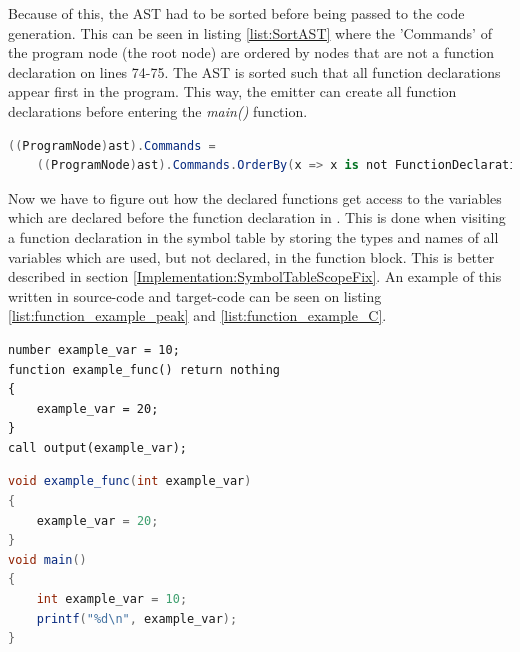 Because of this, the AST had to be sorted before being passed to the code generation. This can be seen in listing \ref{list:SortAST} where the 'Commands' of the program node (the root node) are ordered by nodes that are not a function declaration on lines 74-75. The AST is sorted such that all function declarations appear first in the program. This way, the emitter can create all function declarations before entering the \textit{main()} function. 

\begin{lstlisting}[language = csharp, firstnumber=74, label={list:SortAST},caption=Sorting AST so function declarations appear at the top - CobraCompiler/Program.cs]
((ProgramNode)ast).Commands = 
    ((ProgramNode)ast).Commands.OrderBy(x => x is not FunctionDeclarationNode).ToList();
\end{lstlisting}

\noindent
Now we have to figure out how the declared functions get access to the variables which are declared before the function declaration in \lang. This is done when visiting a function declaration in the symbol table by storing the types and names of all variables which are used, but not declared, in the function block. This is better described in section \ref{Implementation:SymbolTableScopeFix}. An example of this written in source-code and target-code can be seen on listing \ref{list:function_example_peak} and \ref{list:function_example_C}.

\begin{lstlisting}[language = scriptkid, firstnumber=0, label={list:function_example_peak},caption=Example of a function being declared after a variabe has been declared. The function then uses the variable without passing it as an argument]
number example_var = 10;
function example_func() return nothing
{
    example_var = 20;
}
call output(example_var);
\end{lstlisting}

\begin{lstlisting}[language = csharp, firstnumber=1, label={list:function_example_C},caption=Example of the corresponding code from listing \ref{list:function_example_peak} written in C. The function gets declared before entering main and an additional argument is added for the variable used outside of the function]
void example_func(int example_var)
{
    example_var = 20;
}
void main()
{
    int example_var = 10;
    printf("%d\n", example_var);
}
\end{lstlisting}